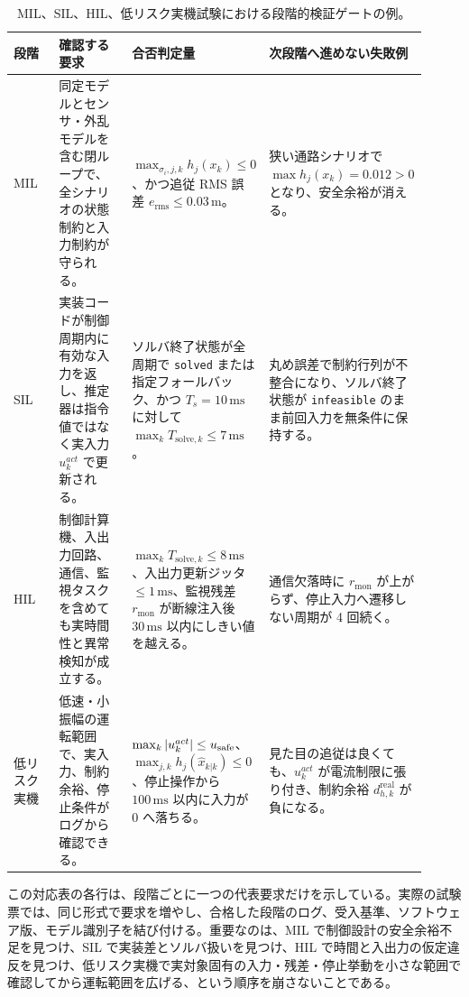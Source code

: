 \begin{table}[tb]
  \centering
  \caption[段階的検証ゲートの例]{MIL、SIL、HIL、低リスク実機試験における段階的検証ゲートの例。}
  \begingroup
  \setlength{\tabcolsep}{2pt}
  \footnotesize
  \begin{tabular}{@{}>{\raggedright\arraybackslash}p{0.12\linewidth}>{\raggedright\arraybackslash}p{0.22\linewidth}>{\raggedright\arraybackslash}p{0.32\linewidth}>{\raggedright\arraybackslash}p{0.25\linewidth}@{}}
    \hline
    段階 & 確認する要求 & 合否判定量 & 次段階へ進めない失敗例 \\
    \hline
    MIL &
    同定モデルとセンサ・外乱モデルを含む閉ループで、全シナリオの状態制約と入力制約が守られる。 &
    $\max_{\sigma_i,j,k} h_j(x_k)\le0$、かつ追従 RMS 誤差 $e_{\mathrm{rms}}\le0.03\,\mathrm{m}$。 &
    狭い通路シナリオで $\max h_j(x_k)=0.012>0$ となり、安全余裕が消える。 \\
    SIL &
    実装コードが制御周期内に有効な入力を返し、推定器は指令値ではなく実入力 $u_k^{act}$ で更新される。 &
    ソルバ終了状態が全周期で \texttt{solved} または指定フォールバック、かつ $T_s=10\,\mathrm{ms}$ に対して $\max_k T_{\mathrm{solve},k}\le7\,\mathrm{ms}$。 &
    丸め誤差で制約行列が不整合になり、ソルバ終了状態が \texttt{infeasible} のまま前回入力を無条件に保持する。 \\
    HIL &
    制御計算機、入出力回路、通信、監視タスクを含めても実時間性と異常検知が成立する。 &
    $\max_k T_{\mathrm{solve},k}\le8\,\mathrm{ms}$、入出力更新ジッタ $\le1\,\mathrm{ms}$、監視残差 $r_{\mathrm{mon}}$ が断線注入後 $30\,\mathrm{ms}$ 以内にしきい値を越える。 &
    通信欠落時に $r_{\mathrm{mon}}$ が上がらず、停止入力へ遷移しない周期が 4 回続く。 \\
    低リスク実機 &
    低速・小振幅の運転範囲で、実入力、制約余裕、停止条件がログから確認できる。 &
    $\max_k \left|u_k^{act}\right|\le u_{\mathrm{safe}}$、$\max_{j,k}h_j(\hat{x}_{k|k})\le0$、停止操作から $100\,\mathrm{ms}$ 以内に入力が 0 へ落ちる。 &
    見た目の追従は良くても、$u_k^{act}$ が電流制限に張り付き、制約余裕 $d_{h,k}^{\mathrm{real}}$ が負になる。 \\
    \hline
  \end{tabular}
  \endgroup
\end{table}

この対応表の各行は、段階ごとに一つの代表要求だけを示している。実際の試験票では、同じ形式で要求を増やし、合格した段階のログ、受入基準、ソフトウェア版、モデル識別子を結び付ける。重要なのは、MIL で制御設計の安全余裕不足を見つけ、SIL で実装差とソルバ扱いを見つけ、HIL で時間と入出力の仮定違反を見つけ、低リスク実機で実対象固有の入力・残差・停止挙動を小さな範囲で確認してから運転範囲を広げる、という順序を崩さないことである。
